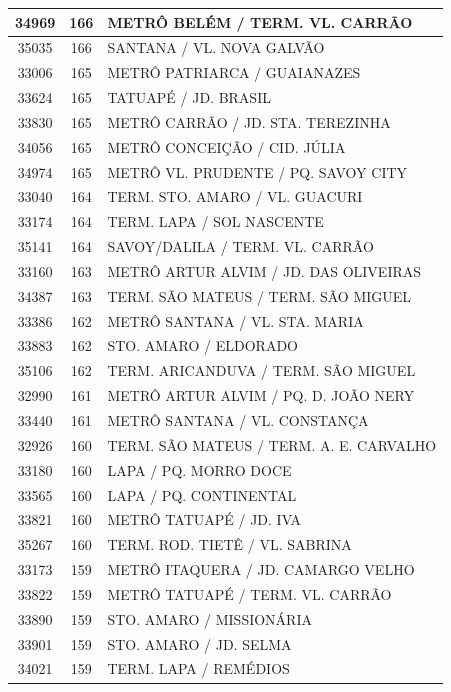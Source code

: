\documentclass[
	12pt,				%
	oneside,			%
	a4paper,			%
	english,			%
	brazil				%
	]{abntex2ppgsi}
\begin{document}
{{\begin{apendicesenv}
\begin{longtable}{c|c|p{7cm}}
 \hline 
34969 &	166 &	METRÔ BELÉM / TERM. VL. CARRÃO \\ 
 \hline 
35035 &	166 &	SANTANA / VL. NOVA GALVÃO \\ 
 \hline 
33006 &	165 &	METRÔ PATRIARCA / GUAIANAZES \\ 
 \hline 
33624 &	165 &	TATUAPÉ / JD. BRASIL \\ 
 \hline 
33830 &	165 &	METRÔ CARRÃO / JD. STA. TEREZINHA \\ 
 \hline 
34056 &	165 &	METRÔ CONCEIÇÃO / CID. JÚLIA \\ 
 \hline 
34974 &	165 &	METRÔ VL. PRUDENTE / PQ. SAVOY CITY \\ 
 \hline 
33040 &	164 &	TERM. STO. AMARO / VL. GUACURI \\ 
 \hline 
33174 &	164 &	TERM. LAPA / SOL NASCENTE \\ 
 \hline 
35141 &	164 &	SAVOY/DALILA / TERM. VL. CARRÃO \\ 
 \hline 
33160 &	163 &	METRÔ ARTUR ALVIM / JD. DAS OLIVEIRAS \\ 
 \hline 
34387 &	163 &	TERM. SÃO MATEUS / TERM. SÃO MIGUEL \\ 
 \hline 
33386 &	162 &	METRÔ SANTANA / VL. STA. MARIA \\ 
 \hline 
33883 &	162 &	STO. AMARO / ELDORADO \\ 
 \hline 
35106 &	162 &	TERM. ARICANDUVA / TERM. SÃO MIGUEL \\ 
 \hline 
32990 &	161 &	METRÔ ARTUR ALVIM / PQ. D. JOÃO NERY \\ 
 \hline 
33440 &	161 &	METRÔ SANTANA / VL. CONSTANÇA \\ 
 \hline 
32926 &	160 &	TERM. SÃO MATEUS / TERM. A. E. CARVALHO \\ 
 \hline 
33180 &	160 &	LAPA / PQ. MORRO DOCE \\ 
 \hline 
33565 &	160 &	LAPA / PQ. CONTINENTAL \\ 
 \hline 
33821 &	160 &	METRÔ TATUAPÉ / JD. IVA \\ 
 \hline 
35267 &	160 &	TERM. ROD. TIETÊ / VL. SABRINA \\ 
 \hline 
33173 &	159 &	METRÔ ITAQUERA / JD. CAMARGO VELHO \\ 
 \hline 
33822 &	159 &	METRÔ TATUAPÉ / TERM. VL. CARRÃO \\ 
 \hline 
33890 &	159 &	STO. AMARO / MISSIONÁRIA \\ 
 \hline 
33901 &	159 &	STO. AMARO / JD. SELMA \\ 
 \hline 
34021 &	159 &	TERM. LAPA / REMÉDIOS \\ 

\end{longtable}
\end{apendicesenv}}}
\end{document}
